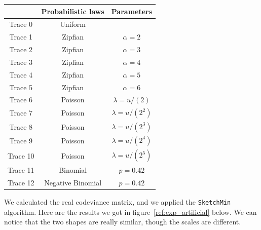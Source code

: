 \documentclass[a4paper]{article}%
\begin{document}
\begin{center}
	\begin{tabular}{|c|c|c|}
		\hline
		 & Probabilistic laws & Parameters \\
		 \hline
		Trace 0 & Uniform & \\
		Trace 1 & Zipfian & $\alpha = 2$ \\
		Trace 2 & Zipfian & $\alpha = 3$ \\
		Trace 3 & Zipfian & $\alpha = 4$ \\
		Trace 4 & Zipfian & $\alpha = 5$ \\ 
		Trace 5 & Zipfian & $\alpha = 6$ \\
		Trace 6 & Poisson & $\lambda = u/(2)$ \\
		Trace 7 & Poisson & $\lambda = u/(2^2)$ \\
		Trace 8 & Poisson & $\lambda = u/(2^3)$ \\
		Trace 9 & Poisson & $\lambda = u/(2^4)$ \\
		Trace 10 & Poisson & $\lambda = u/(2^5)$ \\
		Trace 11 & Binomial & $p = 0.42$ \\
		Trace 12 & Negative Binomial & $p = 0.42$ \\
		\hline
	\end{tabular}
\end{center}


We calculated the real codeviance matrix, and we applied the \texttt{SketchMin} algorithm. Here are the results we got in figure~\ref{ref:exp_artificial} below. We can notice that the two shapes are really similar, though the scales are different.
\end{document}

